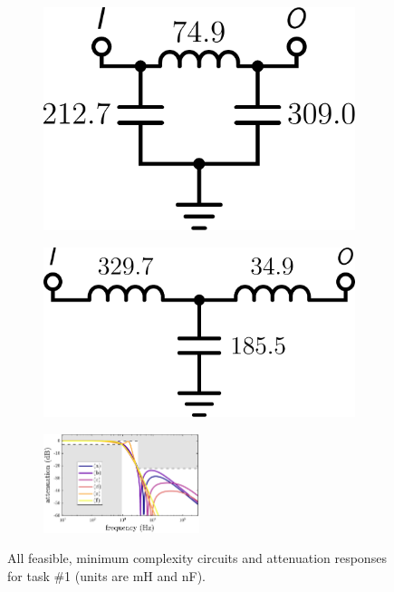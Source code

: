 \begin{figure}
\begin{subfigure}[t]{0.16\textwidth}
\caption{\label{fig:lpf1_circuitd}}
\end{subfigure}%
\begin{subfigure}[t]{0.16\textwidth}
\centering
\includegraphics[scale = 0.14]{../ch6/figures/lpf1_circuit3}
\caption{\label{fig:lpf1_circuite}}
\end{subfigure}%
\begin{subfigure}[t]{0.16\textwidth}
\centering
\includegraphics[scale = 0.14]{../ch6/figures/lpf1_circuit6}
\caption{\label{fig:lpf1_circuitf}}
\end{subfigure}%
\vspace{0.06in}
\begin{subfigure}[t]{\textwidth}
\centering
\includegraphics[width=0.5\textwidth]{../ch6/figures/reduced/r_lpf1_magnitude}
\caption{\label{fig:lpf1_magnitude}}
\end{subfigure}%

\caption[All feasible, minimum complexity circuits and attenuation responses for  task \#1.]{All feasible, minimum complexity circuits and attenuation responses for  task \#1 (units are mH and nF).\label{fig:lpf1}}

\end{figure}